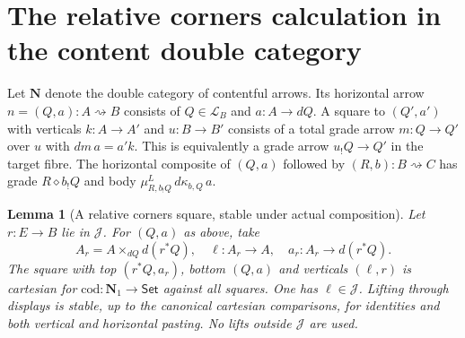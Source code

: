 \documentclass[11pt]{article}
\newtheorem{lemma}[theorem]{Lemma}
\theoremstyle{definition}
\newcommand{\Set}{\mathsf{Set}}
\newcommand{\J}{\mathcal J}
\newcommand{\Lcat}{\mathcal L}
\begin{document}
\section{The relative corners calculation in the content double category}

Let $\mathbf N$ denote the double category of contentful arrows.
Its horizontal arrow $n=(Q,a):A\rightsquigarrow B$ consists of
$Q\in\Lcat_B$ and $a:A\to dQ$. A square to $(Q',a')$ with verticals
$k:A\to A'$ and $u:B\to B'$ consists of a total grade arrow
$m:Q\to Q'$ over $u$ with $dm\,a=a'k$.
This is equivalently a grade arrow $u_!Q\to Q'$ in the target fibre.
The horizontal composite of $(Q,a)$ followed by $(R,b):B\rightsquigarrow C$
has grade $R\diamond b_!Q$ and body $\mu^L_{R,b_!Q}\,d\kappa_{b,Q}\,a$.

\begin{lemma}[A relative corners square, stable under actual composition]
\label{lem:corner}
Let $r:E\to B$ lie in $\J$. For $(Q,a)$ as above, take
\[
 A_r=A\times_{dQ}d(r^*Q),\quad
 \ell:A_r\to A,\quad
 a_r:A_r\to d(r^*Q).
\]
The square with top $(r^*Q,a_r)$, bottom $(Q,a)$ and verticals $(\ell,r)$
is cartesian for $\mathrm{cod}:\mathbf N_1\to\Set$ against all squares.
One has $\ell\in\J$. Lifting through displays is stable, up to the
canonical cartesian comparisons, for identities and both vertical and
horizontal pasting. No lifts outside $\J$ are used.
\end{lemma}
\end{document}
